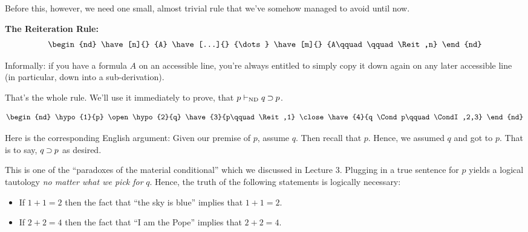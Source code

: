 \documentclass[options]{philosophersimprint}
\begin{document}
Before this, however, we need one small, almost trivial rule that we've somehow managed to avoid until now.
\begin{center}
\begin{minipage}[t]{0.25\textwidth}
\textbf{The Reiteration Rule:}
\vspace{-0.5cm}
\begin{align*}
    \begin{nd}
        \have[n]{} {A}
        \have[...]{} {\dots}
        \have[m]{} {A\qquad\qquad \Reit,n}
    \end{nd}
\end{align*}
\end{minipage}
\hfill
\begin{minipage}[t]{0.20\textwidth}
Informally: if you have a formula $A$ on an accessible line, you're always entitled to simply copy it down again on any later accessible line (in particular, down into a sub-derivation).
\end{minipage}
\end{center}
\vspace{-0.5cm}
That's the whole rule. We'll use it immediately to prove, that $p\vdash_{\mathrm{ND}} q \mathbin{\supset} p$.
\vspace{-0.75cm}
\begin{center}
\begin{minipage}[t]{0.25\textwidth}
\begin{align*}
\begin{nd}
\hypo{1}{p}
\open
\hypo{2}{q}
\have{3}{p\qquad\Reit,1}
\close
\have{4}{q \Cond p\qquad\CondI,2,3}
\end{nd}
\end{align*}
\end{minipage}
\hfill
\begin{minipage}[t]{0.20\textwidth}
\vspace{0.5cm}
Here is the corresponding English argument: Given our premise of $p$, assume $q$. Then recall that $p$. Hence, we assumed $q$ and got to $p$. That is to say, $q\mathbin{\supset} p$ as desired.
\end{minipage}
\end{center}
\vspace{-0.25cm}
This is one of the ``paradoxes of the material conditional'' which we discussed in Lecture 3. Plugging in a true sentence for $p$ yields a logical tautology \textit{no matter what we pick for} $q$. Hence, the truth of the following statements is logically necessary:
\begin{itemize}
    \item If $1+1=2$ then the fact that ``the sky is blue'' implies that $1+1=2$.
    \item If $2+2=4$ then the fact that ``I am the Pope'' implies that $2+2=4$.
\end{itemize}
\end{document}
